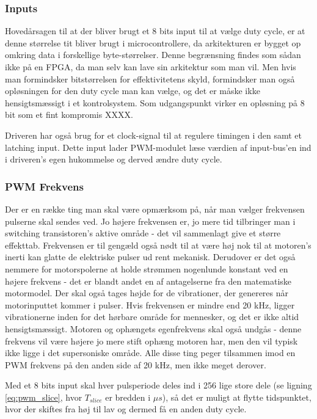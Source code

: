\subsubsection{Inputs}

Hovedårsagen til at der bliver brugt et 8 bits input til at vælge duty cycle, er at denne størrelse tit bliver brugt i microcontrollere, da arkitekturen er bygget op omkring data i forskellige byte-størrelser. Denne begrænsning findes som sådan ikke på en FPGA, da man selv kan lave sin arkitektur som man vil. Men hvis man formindsker bitstørrelsen for effektivitetens skyld, formindsker man også opløsningen for den duty cycle man kan vælge, og det er måske ikke hensigtsmæssigt i et kontrolsystem. Som udgangspunkt virker en opløsning på 8 bit som et fint kompromis XXXX.

Driveren har også brug for et clock-signal til at regulere timingen i den samt et latching input. Dette input lader PWM-modulet læse værdien af input-bus'en ind i driveren's egen hukommelse og derved ændre duty cycle.

\subsubsection{PWM Frekvens}

Der er en række ting man skal være opmærksom på, når man vælger frekvensen pulserne skal sendes ved. Jo højere frekvensen er, jo mere tid tilbringer man i switching transistoren's aktive område - det vil sammenlagt give et større effekttab. Frekvensen er til gengæld også nødt til at være høj nok til at motoren's inerti kan glatte de elektriske pulser ud rent mekanisk. Derudover er det også nemmere for motorspolerne at holde strømmen nogenlunde konstant ved en højere frekvens - det er blandt andet en af antagelserne fra den matematiske motormodel. Der skal også tages højde for de vibrationer, der genereres når motorinputtet kommer i pulser. Hvis frekvensen er mindre end 20 kHz, ligger vibrationerne inden for det hørbare område for mennesker, og det er ikke altid hensigtsmæssigt. Motoren og ophængets egenfrekvens skal også undgås - denne frekvens vil være højere jo mere stift ophæng motoren har, men den vil typisk ikke ligge i det supersoniske område. Alle disse ting peger tilsammen imod en PWM frekvens på den anden side af 20 kHz, men ikke meget derover. 

Med et 8 bits input skal hver pulsperiode deles ind i 256 lige store dele (se ligning \ref{eq:pwm_slice}, hvor $T_{slice}$ er bredden i $\mu s$), så det er muligt at flytte tidspunktet, hvor der skiftes fra høj til lav og dermed få en anden duty cycle. 

